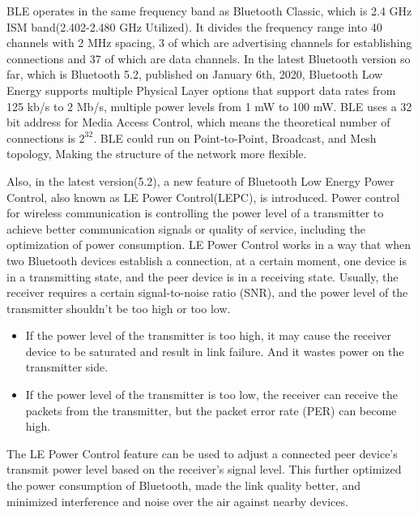 \documentclass[10pt,journal,final,a4paper,nofonttune]{IEEEtran}
\begin{document}
BLE operates in the same frequency band as Bluetooth Classic, which is 2.4 GHz ISM band(2.402-2.480 GHz Utilized)\cite{sigwebsite}. It divides the frequency range into 40 channels with 2 MHz spacing, 3 of which are advertising channels for establishing connections and 37 of which are data channels.
In the latest Bluetooth version so far, which is Bluetooth 5.2, published on January 6th, 2020, Bluetooth Low Energy supports multiple Physical Layer options that support data rates from 125 kb/s to 2 Mb/s, multiple power levels from 1 mW to 100 mW\cite{sigwebsite, gomez2012overview}. 
BLE uses a 32 bit address for Media Access Control, which means the theoretical number of connections is $ 2^{32} $. BLE could run on Point-to-Point, Broadcast, and Mesh topology, Making the structure of the network more flexible.

Also, in the latest version(5.2), a new feature of Bluetooth Low Energy Power Control, also known as LE Power Control(LEPC), is introduced. Power control for wireless communication is controlling the power level of a transmitter to achieve better communication signals or quality of service, including the optimization of power consumption\cite{bluetoothspec2020}. LE Power Control works in a way that when two Bluetooth devices establish a connection, at a certain moment, one device is in a transmitting state, and the peer device is in a receiving state. Usually, the receiver requires a certain signal-to-noise ratio (SNR), and the power level of the transmitter shouldn't be too high or too low. 

\begin{itemize}
    \item If the power level of the transmitter is too high, it may cause the receiver device to be saturated and result in link failure. And it wastes power on the transmitter side.
    \item If the power level of the transmitter is too low, the receiver can receive the packets from the transmitter, but the packet error rate (PER) can become high.
\end{itemize}

The LE Power Control feature can be used to adjust a connected peer device’s transmit power level based on the receiver’s signal level.\cite{bluetoothspec2020}
This further optimized the power consumption of Bluetooth, made the link quality better, and minimized interference and noise over the air against nearby devices. 
\end{document}
